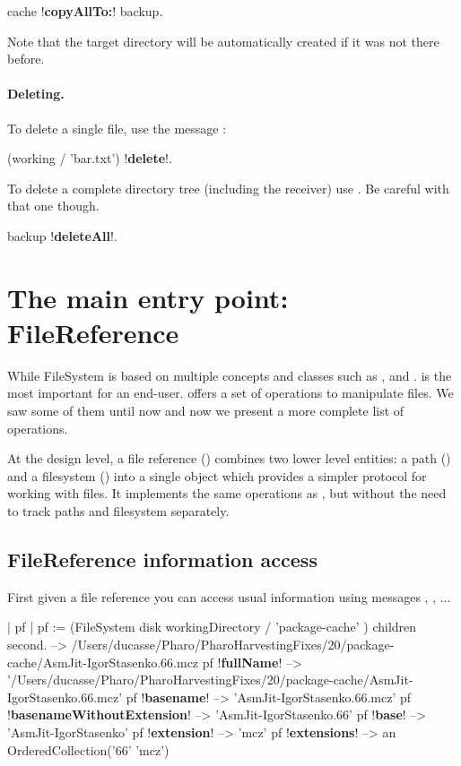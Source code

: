 \documentclass[a4paper,10pt,twoside]{book}
\begin{document}
\begin{code}{}
cache !\textbf{copyAllTo:}! backup.
\end{code}

Note that the target directory will be automatically created if it was not there before.

\paragraph{Deleting.}

To delete a single file, use the message :
\begin{code}{}
 (working / 'bar.txt') !\textbf{delete}!.
\end{code}

To delete a complete directory tree (including the receiver) use . Be careful with that one though.

\begin{code}{}
backup !\textbf{deleteAll}!.
\end{code}




\section{The main entry point: FileReference}
While FileSystem is based on multiple concepts and classes such as \mbox{,}  and .  is the most important for an end-user.  offers a set of operations to manipulate files. We saw some of them until now and now we present a more complete list of operations.

At the design level, a file reference () combines two lower level entities: a path () and a filesystem () into a single object which provides a simpler protocol for working with files. It implements the same operations as , but without the need to track paths and filesystem separately.

\subsection{FileReference information access}
First given a file reference you can access usual information using messages , , ...

\begin{code}{}
| pf |
pf := (FileSystem disk workingDirectory / 'package-cache' ) children second.
  -->  /Users/ducasse/Pharo/PharoHarvestingFixes/20/package-cache/AsmJit-IgorStasenko.66.mcz
pf !\textbf{fullName}!
  --> '/Users/ducasse/Pharo/PharoHarvestingFixes/20/package-cache/AsmJit-IgorStasenko.66.mcz'
pf !\textbf{basename}!
  --> 'AsmJit-IgorStasenko.66.mcz'  
pf !\textbf{basenameWithoutExtension}! 
  -->	'AsmJit-IgorStasenko.66'
pf !\textbf{base}! 
	--> 'AsmJit-IgorStasenko'
pf !\textbf{extension}! 
    --> 'mcz'
pf !\textbf{extensions}!
	--> an OrderedCollection('66' 'mcz')
\end{code}
\end{document}
